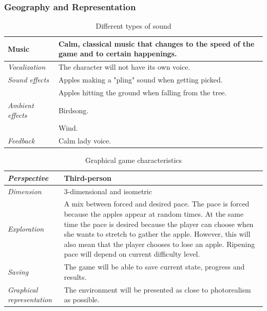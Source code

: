 \subsubsection{Geography and Representation}

\begin{table} [H]
\centering
\begin{tabular}{|p{}|p{}|}
\hline
{Music} & Calm, classical music that changes to the speed of the game and to certain happenings. \\ \hline
\emph{Vocalization} & The character will not have its own voice. \\ \hline
\emph{Sound effects} & Apples making a "pling" sound when getting picked.  \\ \cline{2-2}
&  Apples hitting the ground when falling from the tree. \\ \hline
\emph{Ambient effects} & Birdsong. \\ \cline{2-2}
& Wind. \\ \hline
\emph{Feedback} & Calm lady voice. \\ \hline
\end{tabular}
\caption[Different types of sounds in the "Apple Picking" game]{Different types of sound}
\label{tab:sound2}
\end{table}  

\begin{table} [H]
\centering
\begin{tabular}{|p{}|p{}|}
\hline
\emph {Perspective} & Third-person \\ \hline
\emph{Dimension} &  3-dimensional and isometric \\ \hline
\emph{Exploration} &  A mix between forced and desired pace. The pace is forced because the apples appear at random times. At the same time the pace is desired because the player can choose when she wants to stretch to gather the apple. However, this will also mean that the player chooses to lose an apple. Ripening pace will depend on current difficulty level.\\ \hline
\emph{Saving} & The game will be able to save current state, progress and results. \\ \hline
\emph{Graphical representation} & The environment will be presented as close to photorealism as possible.  \\ \hline
\end{tabular}
\caption[Graphical game characteristics in the "Apple Picking" game]{Graphical game characteristics}
\label{tab:graphical2}
\end{table}  

